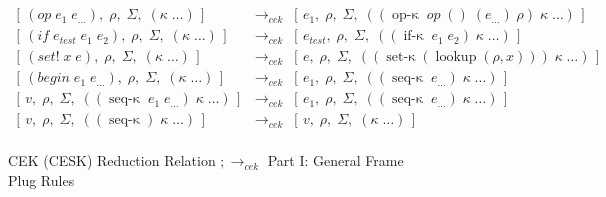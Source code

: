 \begin{figure}
{\begin{minipage}{\textwidth}
\begin{align*}
        [\,e_1,\;\rho_{op},\;\Sigma,\\
        &\; \hspace{1.5cm} \;((\operatorname{op-\kappa}\;op\;(v\;\ldots\;v_1)\;(e_{\ldots})\;\rho_{op})\;\kappa\;\ldots)\,]\\
%
        [\,(op\;e_1\;e_{\ldots}),\;\rho,\;\Sigma,\;(\kappa\;\ldots)\,]
        &\;\longrightarrow_{\textit{cek}}\;
        [\,e_1,\;\rho,\;\Sigma,\;((\operatorname{op-\kappa}\;op\;()\;(e_{\ldots})\;\rho)\;\kappa\;\ldots)\,]\\
%
        [\,(if\;e_{test}\;e_1\;e_2),\;\rho,\;\Sigma,\;(\kappa\;\ldots)\,]
        &\;\longrightarrow_{\textit{cek}}\;
        [\,e_{test},\;\rho,\;\Sigma,\;((\operatorname{if-\kappa}\;e_1\;e_2)\;\kappa\;\ldots)\,]\\
%
        [\,(set!\;x\;e),\;\rho,\;\Sigma,\;(\kappa\;\ldots)\,]
        &\;\longrightarrow_{\textit{cek}}\;
        [\,e,\;\rho,\;\Sigma,\;((\operatorname{set-\kappa}(\operatorname{lookup}(\rho,x)))\;\kappa\;\ldots)\,]\\
%
        [\,(begin\;e_1\;e_{\ldots}),\;\rho,\;\Sigma,\;(\kappa\;\ldots)\,]
        &\;\longrightarrow_{\textit{cek}}\;
        [\,e_1,\;\rho,\;\Sigma,\;((\operatorname{seq-\kappa}\;e_{\ldots})\;\kappa\;\ldots)\,]\\
%
        [\,v,\;\rho,\;\Sigma,\;((\operatorname{seq-\kappa}\;e_1\;e_{\ldots})\;\kappa\;\ldots)\,]
        &\;\longrightarrow_{\textit{cek}}\;
        [\,e_1,\;\rho,\;\Sigma,\;((\operatorname{seq-\kappa}\;e_{\ldots})\;\kappa\;\ldots)\,]\\
%
        [\,v,\;\rho,\;\Sigma,\;((\operatorname{seq-\kappa})\;\kappa\;\ldots)\,]
        &\;\longrightarrow_{\textit{cek}}\;
        [\,v,\;\rho,\;\Sigma,\;(\kappa\;\ldots)\,]\\
      \end{align*}
    \end{minipage}%
  }
  \vspace{0.6em}
  \caption{CEK (CESK) Reduction Relation $;\longrightarrow_{\textit{cek}}$ Part I: General Frame Plug Rules}
  \label{fig:cek-reduction-relation-redacted-general}
\end{figure}
